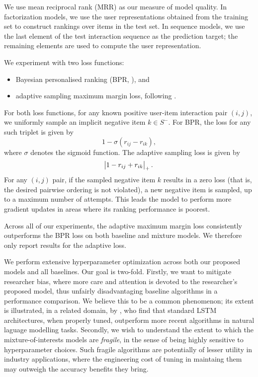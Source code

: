 \documentclass[sigconf]{acmart}
\newcommand\symUserInteractionSet{S}
\begin{document}
We use mean reciprocal rank (MRR) as our measure of model quality. In factorization models, we use the user representations obtained from the training set to construct rankings over items in the test set. In sequence models, we use the last element of the test interaction sequence as the prediction target; the remaining elements are used to compute the user representation.

We experiment with two loss functions:
\begin{itemize}
\item Bayesian personalised ranking (BPR, \citet{rendle2009bpr}), and
\item adaptive sampling maximum margin loss, following \citet{weston2011wsabie}.
\end{itemize}
For both loss functions, for any known positive user-item interaction pair $(i, j)$, we uniformly sample an implicit negative item $k \in \symUserInteractionSet^-$. For BPR, the loss for any such triplet is given by
\begin{equation}
1 - \sigma\left(r_{ij} - r_{ik}\right),
\end{equation}
where $\sigma$ denotes the sigmoid function.
The adaptive sampling loss is given by
\begin{equation}
\abs{1 - r_{ij} + r_{ik}}_{+}.
\end{equation}
For any $(i, j)$ pair, if the sampled negative item $k$ results in a zero loss (that is, the desired pairwise ordering is not violated), a new negative item is sampled, up to a maximum number of attempts. This leads the model to perform more gradient updates in areas where its ranking performance is poorest.

Across all of our experiments, the adaptive maximum margin loss consistently outperforms the BPR loss on both baseline and mixture models. We therefore only report results for the adaptive loss.

We perform extensive hyperparameter optimization across both our proposed models and all baselines. Our goal is two-fold. Firstly, we want to mitigate researcher bias, where more care and attention is devoted to the researcher's proposed model, thus unfairly disadvantaging baseline algorithms in a performance comparison. We believe this to be a common phenomenon; its extent is illustrated, in a related domain, by \cite{melis2017state}, who find that standard LSTM architectures, when properly tuned, outperform more recent algorithms in natural laguage modelling tasks. Secondly, we wish to understand the extent to which the mixture-of-interests models are \emph{fragile}, in the sense of being highly sensitive to hyperparameter choices. Such fragile algorithms are potentially of lesser utility in industry applications, where the engineering cost of tuning in maintaing them may outweigh the accuracy benefits they bring.
\end{document}
